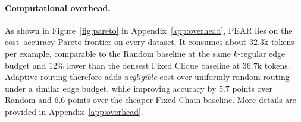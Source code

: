 \paragraph{Computational overhead.}
As shown in Figure~\ref{fig:pareto} in Appendix~\ref{app:overhead}, PEAR lies on the cost--accuracy Pareto frontier on every dataset. It consumes about $32.3$k tokens per example, comparable to the Random baseline at the same $k$-regular edge budget and $12\%$ lower than the densest Fixed Clique baseline at $36.7$k tokens. Adaptive routing therefore adds \emph{negligible} cost over uniformly random routing under a similar edge budget, while improving accuracy by $5.7$ points over Random and $6.6$ points over the cheaper Fixed Chain baseline. More details are provided in Appendix~\ref{app:overhead}.




 

 